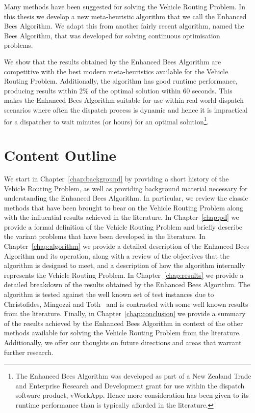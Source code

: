 Many methods have been suggested for solving the Vehicle Routing Problem. In this thesis we develop a new meta-heuristic algorithm that we call the Enhanced Bees Algorithm. We adapt this from another fairly recent algorithm, named the Bees Algorithm, that was developed for solving continuous optimisation problems.

We show that the results obtained by the Enhanced Bees Algorithm are competitive with the best modern meta-heuristics available for the Vehicle Routing Problem. Additionally, the algorithm has good runtime performance, producing results within 2\% of the optimal solution within 60 seconds. This makes the Enhanced Bees Algorithm suitable for use within real world dispatch scenarios where often the dispatch process is dynamic and hence it is impractical for a dispatcher to wait minutes (or hours) for an optimal solution\footnote{The Enhanced Bees Algorithm was developed as part of a New Zealand Trade and Enterprise Research and Development grant for use within the dispatch software product, vWorkApp. Hence more consideration has been given to its runtime performance than is typically afforded in the literature.}.

\section{Content Outline}

We start in Chapter~\ref{chap:background} by providing a short history of the Vehicle Routing Problem, as well as providing background material necessary for understanding the Enhanced Bees Algorithm. In particular, we review the classic methods that have been brought to bear on the Vehicle Routing Problem along with the influential results achieved in the literature. In Chapter~\ref{chap:pd} we provide a formal definition of the Vehicle Routing Problem and briefly describe the variant problems that have been developed in the literature. In Chapter~\ref{chap:algorithm} we provide a detailed description of the Enhanced Bees Algorithm and its operation, along with a review of the objectives that the algorithm is designed to meet, and a description of how the algorithm internally represents the Vehicle Routing Problem. In Chapter~\ref{chap:results} we provide a detailed breakdown of the results obtained by the Enhanced Bees Algorithm. The algorithm is tested against the well known set of test instances due to Christofides, Mingozzi and Toth~\cite{CMT:1981} and is contrasted with some well known results from the literature. Finally, in Chapter~\ref{chap:conclusion} we provide a summary of the results achieved by the Enhanced Bees Algorithm in context of the other methods available for solving the Vehicle Routing Problem from the literature. Additionally, we offer our thoughts on future directions and areas that warrant further research.  
